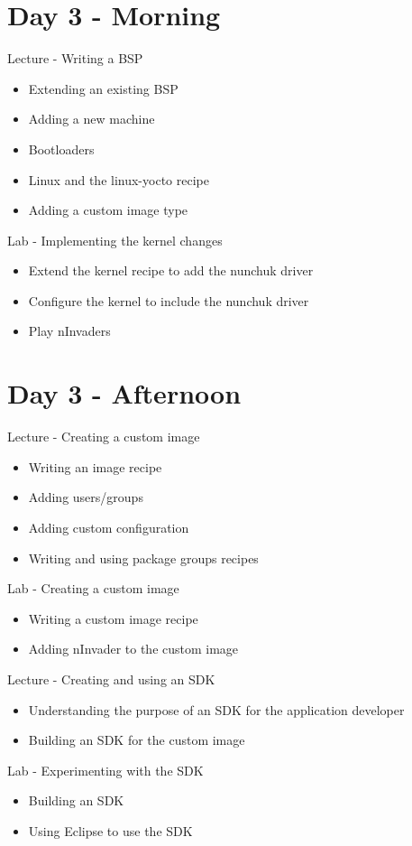 \documentclass[a4paper,12pt,obeyspaces,spaces,hyphens]{article}
\begin{document}
\section{Day 3 - Morning}

\feagendatwocolumn
{Lecture - Writing a BSP}
{
  \begin{itemize}
  \item Extending an existing BSP
  \item Adding a new machine
  \item Bootloaders
  \item Linux and the linux-yocto recipe
  \item Adding a custom image type
  \end{itemize}
}
{Lab - Implementing the kernel changes}
{
  \begin{itemize}
  \item Extend the kernel recipe to add the nunchuk driver
  \item Configure the kernel to include the nunchuk driver
  \item Play nInvaders
  \end{itemize}
}

\section{Day 3 - Afternoon}

\feagendatwocolumn
{Lecture - Creating a custom image}
{
  \begin{itemize}
  \item Writing an image recipe
  \item Adding users/groups
  \item Adding custom configuration
  \item Writing and using package groups recipes
  \end{itemize}
}
{Lab - Creating a custom image}
{
  \begin{itemize}
  \item Writing a custom image recipe
  \item Adding nInvader to the custom image
  \end{itemize}
}
\feagendatwocolumn
{Lecture - Creating and using an SDK}
{
  \begin{itemize}
  \item Understanding the purpose of an SDK for the application
    developer
  \item Building an SDK for the custom image
  \end{itemize}
}
{Lab - Experimenting with the SDK}
{
  \begin{itemize}
  \item Building an SDK
  \item Using Eclipse to use the SDK
  \end{itemize}
}
\end{document}

